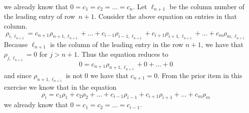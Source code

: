 \begin{exercises}
\begin{answer}
\begin{exparts}
\begin{equation*}
          \end{equation*}
          we already know that $0=c_1=c_2=\dots =c_n$.
          Let $\ell_{n+1}$ be the column number of the leading entry of
          row~$n+1$. 
          Consider the above equation on entries in that column.
          \begin{equation*}
             \rho_{i,\ell_{n+1}}=c_{n+1}\rho_{n+1,\ell_{n+1}}+\ldots
                             +c_{i-1}\rho_{i-1,\ell_{n+1}}
                             +c_{i+1}\rho_{i+1,\ell_{n+1}}
                             +\dots+c_m\rho_{m,\ell_{n+1}}
          \end{equation*}
          Because $\ell_{n+1}$ is the column of the leading entry in the
          row $n+1$, we have that $\rho_{j,\ell_{n+1}}=0$ for $j>{n+1}$.  
          Thus the equation reduces to  
          \begin{equation*}
             0=c_{n+1}\rho_{n+1,\ell_{n+1}}+0+\ldots+0
          \end{equation*}
          and since $\rho_{n+1,\ell_{n+1}}$ is not $0$ we have that $c_{n+1}=0$.
        \partsitem 
          From the prior item in this exercise we know that in the equation 
          \begin{equation*}
            \rho_i=c_1\rho_1+c_2\rho_2+\ldots+c_{i-1}\rho_{i-1}+
                     c_{i+1}\rho_{i+1}+\ldots+c_m\rho_m
          \end{equation*}
          we already know that $0=c_1=c_2=\dots =c_{i-1}$.


\end{exparts}
\end{answer}
\end{exercises}

